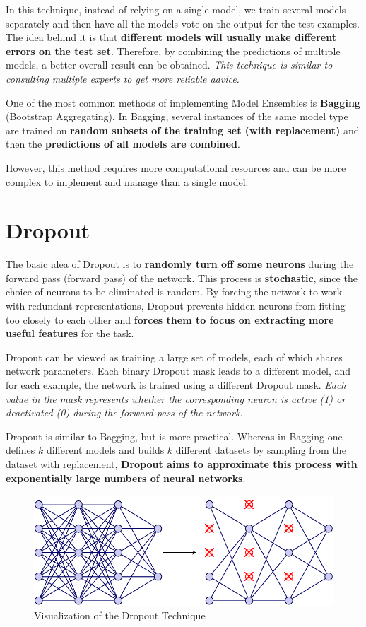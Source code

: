 In this technique, instead of relying on a single model, we train several models separately and then have all the models vote on the output for the test examples. The idea behind it is that \textbf{different models will usually make different errors on the test set}. Therefore, by combining the predictions of multiple models, a better overall result can be obtained. \textit{This technique is similar to consulting multiple experts to get more reliable advice.}

One of the most common methods of implementing Model Ensembles is \textbf{Bagging} (Bootstrap Aggregating). In Bagging, several instances of the same model type are trained on \textbf{random subsets of the training set (with replacement)} and then the \textbf{predictions of all models are combined}. 

However, this method requires more computational resources and can be more complex to implement and manage than a single model.

\section{Dropout}

The basic idea of Dropout is to \textbf{randomly turn off some neurons} during the forward pass (forward pass) of the network. This process is \textbf{stochastic}, since the choice of neurons to be eliminated is random. By forcing the network to work with redundant representations, Dropout prevents hidden neurons from fitting too closely to each other and \textbf{forces them to focus on extracting more useful features} for the task.

Dropout can be viewed as training a large set of models, each of which shares network parameters. Each binary Dropout mask leads to a different model, and for each example, the network is trained using a different Dropout mask. \textit{Each value in the mask represents whether the corresponding neuron is active (1) or deactivated (0) during the forward pass of the network.}

Dropout is similar to Bagging, but is more practical. Whereas in Bagging one defines \( k \) different models and builds \( k \) different datasets by sampling from the dataset with replacement, \textbf{Dropout aims to approximate this process with exponentially large numbers of neural networks}.

\begin{figure}[!htbp]
    \centering
    \includegraphics[width = \linewidth]{tikz/chapter4 - Dropout.pdf}
    \caption{Visualization of the Dropout Technique}
\end{figure}

